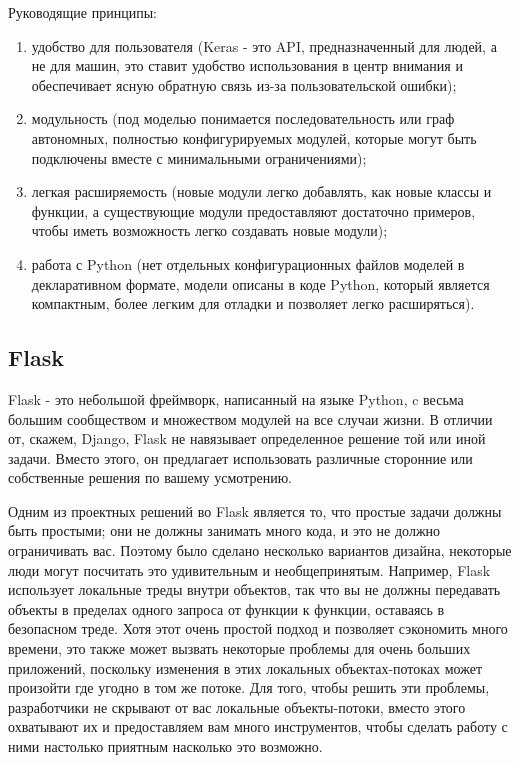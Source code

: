Руководящие принципы:
\begin{enumerate}
  \item удобство для пользователя (Keras - это API, предназначенный для людей, а не для машин, это ставит удобство использования в центр внимания и обеспечивает ясную обратную связь из-за пользовательской ошибки);
  \item модульность (под моделью понимается последовательность или граф автономных, полностью конфигурируемых модулей, которые могут быть подключены вместе с минимальными ограничениями);
  \item легкая расширяемость (новые модули легко добавлять, как новые классы и функции, а существующие модули предоставляют достаточно примеров, чтобы иметь возможность легко создавать новые модули);
  \item работа с Python (нет отдельных конфигурационных файлов моделей в декларативном формате, модели описаны в коде Python, который является компактным, более легким для отладки и позволяет легко расширяться).
\end{enumerate}

\subsection{Flask}
\label{sec:development:flask}

Flask - это небольшой фреймворк, написанный на языке Python, c весьма большим сообществом и множеством модулей на все случаи жизни. В отличии от, скажем, Django, Flask не навязывает определенное решение той или иной задачи. Вместо этого, он предлагает использовать различные сторонние или собственные решения по вашему усмотрению.

Одним из проектных решений во Flask является то, что простые задачи должны быть простыми; они не должны занимать много кода, и это не должно ограничивать вас. Поэтому было сделано несколько вариантов дизайна, некоторые люди могут посчитать это удивительным и необщепринятым. Например, Flask использует локальные треды внутри объектов, так что вы не должны передавать объекты в пределах одного запроса от функции к функции, оставаясь в безопасном треде. Хотя этот очень простой подход и позволяет сэкономить много времени, это также может вызвать некоторые проблемы для очень больших приложений, поскольку изменения в этих локальных объектах-потоках может произойти где угодно в том же потоке. Для того, чтобы решить эти проблемы, разработчики не скрывают от вас локальные объекты-потоки, вместо этого охватывают их и предоставляем вам много инструментов, чтобы сделать работу с ними настолько приятным насколько это возможно.

